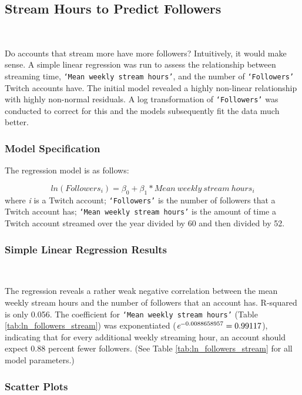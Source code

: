 \documentclass[12pt]{article}
\begin{document}
\subsection{Stream Hours to Predict Followers}\

Do accounts that stream more have more followers? Intuitively, it would make sense. A simple linear regression was run to assess the relationship between streaming time, \texttt{`Mean weekly stream hours'}, and the number of \texttt{`Followers'} Twitch accounts have. The initial model revealed a highly non-linear relationship with highly non-normal residuals. A log transformation of \texttt{`Followers'} was conducted to correct for this and the models subsequently fit the data much better.

\subsubsection{Model Specification}
The regression model is as follows:

\begin{equation}
	ln(Followers_{i}) = \beta_{0} + \beta_{1} \ast Mean\ weekly\ stream\ hours_{i}
	\label{eq:ln_followers_stream}
\end{equation}
where \emph{i} is a Twitch account; \texttt{`Followers'} is the number of followers that a Twitch account has; \texttt{`Mean weekly stream hours'} is the amount of time a Twitch account streamed over the year divided by 60 and then divided by 52.

\subsubsection{Simple Linear Regression Results}\

The regression reveals a rather weak negative correlation between the mean weekly stream hours and the number of followers that an account has. R-squared is only 0.056. The coefficient for \texttt{`Mean weekly stream hours'} (Table \ref{tab:ln_followers_stream}) was exponentiated ($\emph{e}^{-0.0088658957} = 0.99117$), indicating that for every additional weekly streaming hour, an account should expect 0.88 percent fewer followers. (See Table \ref{tab:ln_followers_stream} for all model parameters.)

\subsubsection{Scatter Plots}
\end{document}
